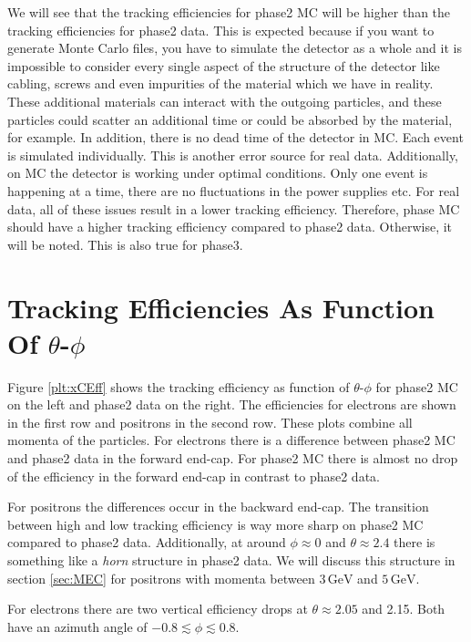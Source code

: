 \documentclass[a4paper,11pt,twosided,final,german,openbib,pdftex,listof=totoc,bibliography=totoc]{scrbook}
\begin{document}
We will see that the tracking efficiencies for phase2 MC will be higher than the tracking efficiencies for phase2 data. This is expected because if you want to generate Monte Carlo files, you have to simulate the detector as a whole and it is impossible to consider every single aspect of the structure of the detector like cabling, screws and even impurities of the material which we have in reality. These additional materials can interact with the outgoing particles, and these particles could scatter an additional time or could be absorbed by the material, for example. In addition, there is no dead time of the detector in MC. Each event is simulated individually. This is another error source for real data. Additionally, on MC the detector is working under optimal conditions. Only one event is happening at a time, there are no fluctuations in the power supplies etc.
For real data, all of these issues result in a lower tracking efficiency. Therefore, phase MC should have a higher tracking efficiency compared to phase2 data. Otherwise, it will be noted. This is also true for phase3.
 

\section{Tracking Efficiencies As Function Of $\theta$-$\phi$ }
\label{sec:tpEff}

Figure \ref{plt:xCEff} shows the tracking efficiency as function of $\theta$-$\phi$ for phase2 MC on the left and phase2 data on the right. The efficiencies for electrons are shown in the first row and positrons in the second row. These plots combine all momenta of the particles. For electrons there is a difference between phase2 MC and phase2 data in the forward end-cap. For phase2 MC there is almost no drop of the efficiency in the forward end-cap in contrast to phase2 data. 

For positrons the differences occur in the backward end-cap. The transition between high and low tracking efficiency is way more sharp on phase2 MC compared to phase2 data. Additionally, at around $\phi \approx 0$ and $\theta \approx 2.4$ there is something like a \textit{horn} structure in phase2 data. We will discuss this structure  in section \ref{sec:MEC} for positrons with momenta between $3\,\textrm{GeV}$ and $5\,\textrm{GeV}$.

For electrons there are two vertical efficiency drops at $\theta \approx 2.05$ and 2.15. Both have an azimuth angle of $-0.8 \lesssim \phi \lesssim 0.8$.
\end{document}
